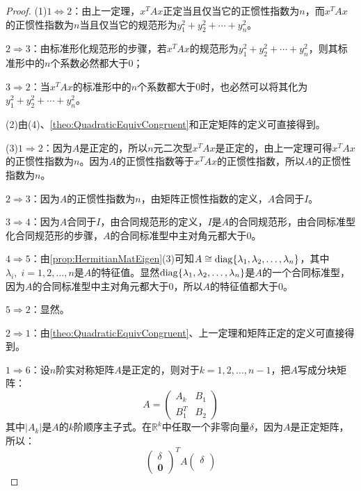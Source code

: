 \begin{proof}
	(1)$1\Leftrightarrow2$：由上一定理，$x^TAx$正定当且仅当它的正惯性指数为$n$，而$x^TAx$的正惯性指数为$n$当且仅当它的规范形为$y_1^2+y_2^2+\cdots+y_n^2$。\par
	$2\Rightarrow3$：由标准形化规范形的步骤，若$x^TAx$的规范形为$y_1^2+y_2^2+\cdots+y_n^2$，则其标准形中的$n$个系数必然都大于$0$；\par
	$3\Rightarrow2$：当$x^TAx$的标准形中的$n$个系数都大于$0$时，也必然可以将其化为$y_1^2+y_2^2+\cdots+y_n^2$。\par
	(2)由(4)、\cref{theo:QuadraticEquivCongruent}和正定矩阵的定义可直接得到。\par	
	(3)$1\Rightarrow2$：因为$A$是正定的，所以$n$元二次型$x^TAx$是正定的，由上一定理可得$x^TAx$的正惯性指数为$n$。因为$A$的正惯性指数等于$x^TAx$的正惯性指数，所以$A$的正惯性指数为$n$。\par
	$2\Rightarrow3$：因为$A$的正惯性指数为$n$，由矩阵正惯性指数的定义，$A$合同于$I$。\par
	$3\Rightarrow4$：因为$A$合同于$I$，由合同规范形的定义，$I$是$A$的合同规范形，由合同标准型化合同规范形的步骤，$A$的合同标准型中主对角元都大于$0$。\par
	$4\Rightarrow5$：由\cref{prop:HermitianMatEigen}(3)可知$A\cong\operatorname{diag}\{\lambda_1, \lambda_2, \dots, \lambda_{n}\}$，其中$\lambda_i,\;i=1,2,\dots,n$是$A$的特征值。显然$\operatorname{diag}\{\lambda_1, \lambda_2, \dots, \lambda_{n}\}$是$A$的一个合同标准型，因为$A$的合同标准型中主对角元都大于$0$，所以$A$的特征值都大于$0$。
	\par
	$5\Rightarrow2$：显然。\par
	$2\Rightarrow1$：由\cref{theo:QuadraticEquivCongruent}、上一定理和矩阵正定的定义可直接得到。\par
	$1\Rightarrow6$：设$n$阶实对称矩阵$A$是正定的，则对于$k=1,2,\dots,n-1$，把$A$写成分块矩阵：
	\begin{equation*}
		A=
		\begin{pmatrix}
			A_k & B_1 \\
			B_1^T & B_2
		\end{pmatrix}
	\end{equation*}
	其中$|A_k|$是$A$的$k$阶顺序主子式。在$\mathbb{R}^{k}$中任取一个非零向量$\delta$，因为$A$是正定矩阵，所以：
	\begin{equation*}
		\begin{pmatrix}
			\delta \\
			\mathbf{0}
		\end{pmatrix}^T
		A
		\begin{pmatrix}
			\delta \\

\end{pmatrix}
\end{equation*}
\end{proof}
